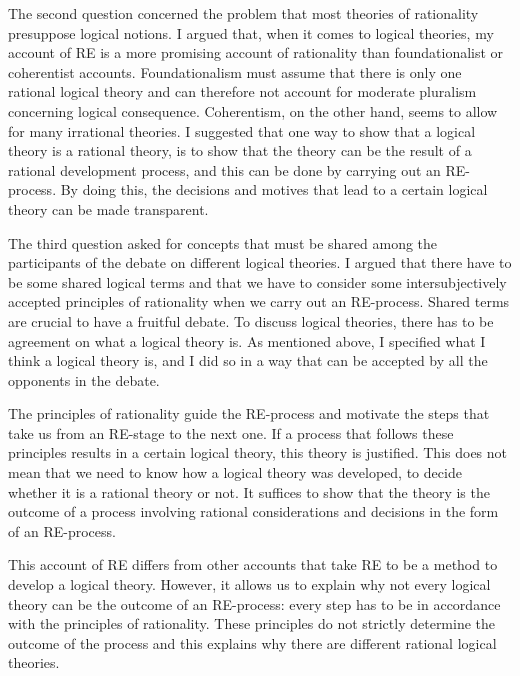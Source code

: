 \documentclass{article}
\begin{document}
The second question concerned the problem that most theories of rationality presuppose logical notions. I argued that, when it comes to logical theories, my account of RE is a more promising account of rationality than foundationalist or coherentist accounts. Foundationalism must assume that there is only one rational logical theory and can therefore not account for moderate pluralism concerning logical consequence. Coherentism, on the other hand, seems to allow for many irrational theories. I suggested that one way to show that a logical theory is a rational theory, is to show that the theory can be the result of a rational development process, and this can be done by carrying out an RE-process. By doing this, the decisions and motives that lead to a certain logical theory can be made transparent.

The third question asked for concepts that must be shared among the participants of the debate on different logical theories. I argued that there have to be some shared logical terms and that we have to consider some intersubjectively accepted principles of rationality when we carry out an RE-process. Shared terms are crucial to have a fruitful debate. To discuss logical theories, there has to be agreement on what a logical theory is. As mentioned above, I specified what I think a logical theory is, and I did so in a way that can be accepted by all the opponents in the debate. 

The principles of rationality guide the RE-process and motivate the steps that take us from an RE-stage to the next one. If a process that follows these principles results in a certain logical theory, this theory is justified. This does not mean that we need to know how a logical theory was developed, to decide whether it is a rational theory or not. It suffices to show that the theory is the outcome of a process involving rational considerations and decisions in the form of an RE-process.

This account of RE differs from other accounts that take RE to be a method to develop a logical theory. However, it allows us to explain why not every logical theory can be the outcome of an RE-process: every step has to be in accordance with the principles of rationality. These principles do not strictly determine the outcome of the process and this explains why there are different rational logical theories.

\newpage


\end{document}

